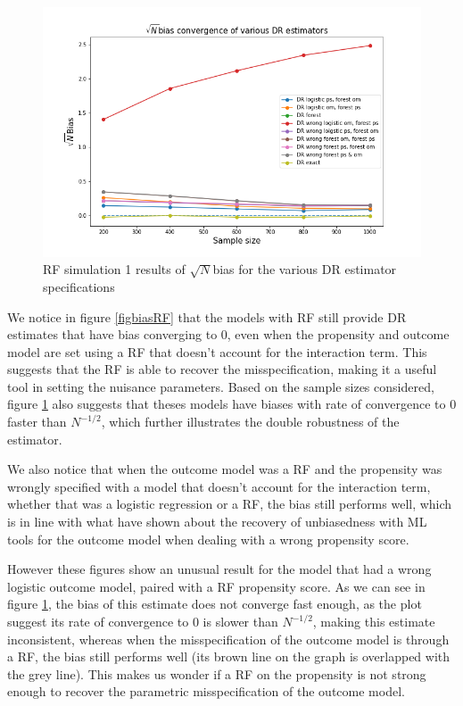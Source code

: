 \documentclass[12pt,twoside]{article}
\begin{document}
\begin{figure} 
    \centering
    \includegraphics[width = 0.9\columnwidth]{figures/sqrtnRF.png}
    \caption{RF simulation 1 results of $\sqrt{N}$bias for the various DR estimator specifications}
    \label{figsqrtnRF}
\end{figure}

We notice in figure \ref{figbiasRF} that the models with RF still provide DR estimates that have bias converging to 0, even when the propensity and outcome model are set using a RF that doesn't account for the interaction term. This suggests that the RF is able to recover the misspecification, making it a useful tool in setting the nuisance parameters. Based on the sample sizes considered, figure \ref{figsqrtnRF} also suggests that theses models have biases with rate of convergence to 0 faster than $N^{-1/2}$, which further illustrates the double robustness of the estimator.

We also notice that when the outcome model was a RF and the propensity was wrongly specified with a model that doesn't account for the interaction term, whether that was a logistic regression or a RF, the bias still performs well, which is in line with what \citet{ps_SL} have shown about the recovery of unbiasedness with ML tools for the outcome model when dealing with a wrong propensity score. 

However these figures show an unusual result for the model that had a wrong logistic outcome model, paired with a RF propensity score. As we can see in figure \ref{figsqrtnRF}, the bias of this estimate does not converge fast enough, as the plot suggest its rate of convergence to 0 is slower than $N^{-1/2}$, making this estimate inconsistent, whereas when the misspecification of the outcome model is through a RF, the bias still performs well (its brown line on the graph is overlapped with the grey line). This makes us wonder if a RF on the propensity is not strong enough to recover the parametric misspecification of the outcome model.
\end{document}

